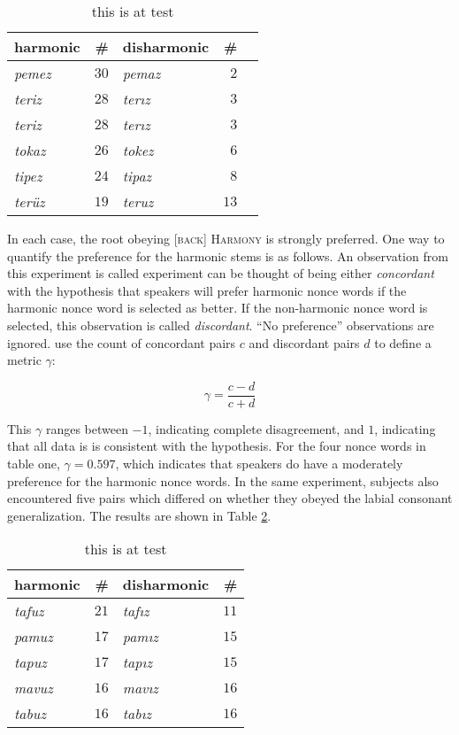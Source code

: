 \begin{table}
\centering
\begin{tabular}{l r l r r}
\toprule
harmonic      & \#   & disharmonic   & \#   \\
\midrule
\emph{pemez} & $30$ & \emph{pemaz} & $2$  \\
\emph{teriz} & $28$ & \emph{terız} & $3$  \\
\emph{teriz} & $28$ & \emph{terız} & $3$  \\
\emph{tokaz} & $26$ & \emph{tokez} & $6$  \\
\emph{tipez} & $24$ & \emph{tipaz} & $8$  \\
\emph{terüz} & $19$ & \emph{teruz} & $13$ \\
\bottomrule
\end{tabular}
\caption{this is at test \citet[][314]{Zimmer1969}}
\label{backharm}
\end{table}

In each case, the root obeying [\textsc{back}] \textsc{Harmony} is strongly preferred. One way to quantify the preference for the harmonic stems is as follows. An observation from this experiment is called experiment can be thought of being either \emph{concordant} with the hypothesis that speakers will prefer harmonic nonce words if the harmonic nonce word is selected as better. If the non-harmonic nonce word is selected, this observation is called \emph{discordant}. ``No preference'' observations are ignored.  \citet[][749]{Goodman1954} use the count of concordant pairs $c$ and discordant pairs $d$ to define a metric $\gamma$:

\begin{equation}
\gamma = \frac{c - d}{c + d}
\end{equation}

This $\gamma$ ranges between $-1$, indicating complete disagreement, and $1$, indicating that all data is is consistent with the hypothesis. For the four nonce words in table one, $\gamma = 0.597$, which indicates that speakers do have a moderately preference for the harmonic nonce words. In the same experiment, subjects also encountered five pairs which differed on whether they obeyed the labial consonant generalization. The results are shown in Table \ref{labcons}.

\begin{table}
\centering
\begin{tabular}{l r l r}
\toprule
harmonic & \# & disharmonic & \# \\
\midrule
\emph{tafuz} & $21$ & \emph{tafız} & $11$ \\
\emph{pamuz} & $17$ & \emph{pamız} & $15$ \\
\emph{tapuz} & $17$ & \emph{tapız} & $15$ \\
\emph{mavuz} & $16$ & \emph{mavız} & $16$ \\
\emph{tabuz} & $16$ & \emph{tabız} & $16$ \\
\bottomrule
\end{tabular}
\caption{this is at test \citet[][314]{Zimmer1969}}
\label{labcons}
\end{table}

